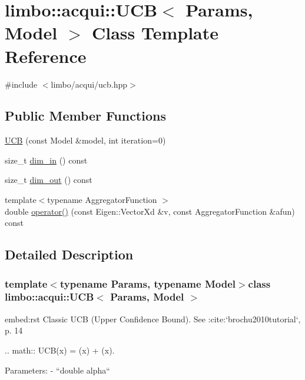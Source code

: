 \hypertarget{classlimbo_1_1acqui_1_1_u_c_b}{}\section{limbo\+:\+:acqui\+:\+:U\+C\+B$<$ Params, Model $>$ Class Template Reference}
\label{classlimbo_1_1acqui_1_1_u_c_b}


{\ttfamily \#include $<$limbo/acqui/ucb.\+hpp$>$}

\subsection*{Public Member Functions}
\begin{DoxyCompactItemize}
\item 
\hyperlink{classlimbo_1_1acqui_1_1_u_c_b_ae4410ba09273ea88b36130ea916fcc60}{U\+C\+B} (const Model \&model, int iteration=0)
\item 
size\+\_\+t \hyperlink{classlimbo_1_1acqui_1_1_u_c_b_ab922a11b709216f35db6ee83fcb86ed5}{dim\+\_\+in} () const 
\item 
size\+\_\+t \hyperlink{classlimbo_1_1acqui_1_1_u_c_b_aa6870bb7764a6f729db39f86eb005d54}{dim\+\_\+out} () const 
\item 
{\footnotesize template$<$typename Aggregator\+Function $>$ }\\double \hyperlink{classlimbo_1_1acqui_1_1_u_c_b_a46ab881ea6bc364bf52c2fa04cfaa1da}{operator()} (const Eigen\+::\+Vector\+Xd \&v, const Aggregator\+Function \&afun) const 
\end{DoxyCompactItemize}


\subsection{Detailed Description}
\subsubsection*{template$<$typename Params, typename Model$>$class limbo\+::acqui\+::\+U\+C\+B$<$ Params, Model $>$}

\begin{DoxyVerb}embed:rst
Classic UCB (Upper Confidence Bound). See :cite:`brochu2010tutorial`, p. 14

  .. math::
    UCB(x) = \mu(x) + \alpha \sigma(x).

Parameters:
  - ``double alpha``
\end{DoxyVerb}
 

